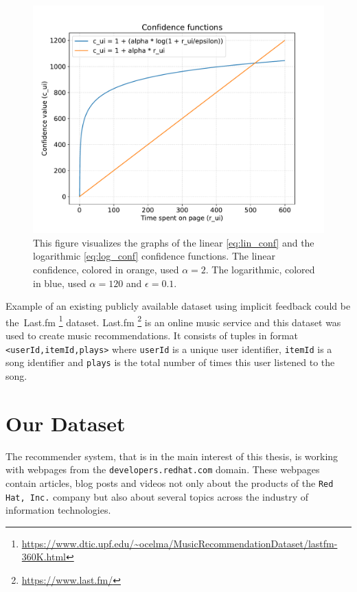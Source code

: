\begin{figure}[H]
    \centering
    \includegraphics[scale=0.65]{obrazky-figures/confidence2.pdf}
    \caption{This figure visualizes the graphs of the linear \ref{eq:lin_conf} and the logarithmic \ref{eq:log_conf} confidence functions. The linear confidence, colored in orange, used $\alpha=2$. The logarithmic, colored in blue, used $\alpha=120$ and $\epsilon=0.1$.}
\end{figure}
Example of an existing publicly available dataset using implicit feedback could be the~Last.fm \footnote{\url{https://www.dtic.upf.edu/~ocelma/MusicRecommendationDataset/lastfm-360K.html}} dataset. Last.fm \footnote{\url{https://www.last.fm/}} is an online music service and this dataset was used to create music recommendations. It consists of tuples in format \texttt{<userId,itemId,plays>} where \texttt{userId} is a unique user identifier, \texttt{itemId} is a song identifier and \texttt{plays} is the total number of times this user listened to the song.


\section{Our Dataset} \label{our_dataset}
The recommender system, that is in the main interest of this thesis, is working with webpages from the \texttt{developers.redhat.com} domain. These webpages contain articles, blog posts and videos not only about the products of the \texttt{Red Hat, Inc.} company but also about several topics across the industry of information technologies.

